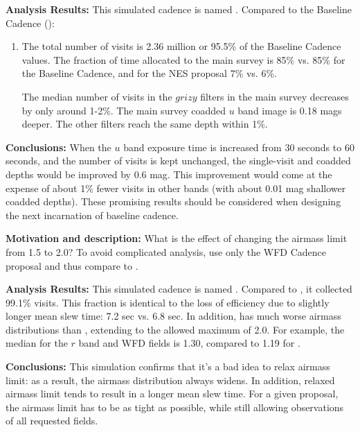 {\bf Analysis Results:}  This simulated cadence is named
.  Compared to the Baseline
Cadence ():
\begin{enumerate}
\item The total number of visits is 2.36 million or 95.5\% of the
Baseline Cadence values. The fraction of time allocated to the main
survey is 85\% vs. 85\% for the Baseline Cadence, and for the NES
proposal 7\% vs. 6\%.

The median number of visits in the $grizy$ filters in the main survey
decreases by only around 1-2\%.  The main survey coadded $u$ band image is 0.18
mags deeper. The other filters reach the same depth within 1\%.
\end{enumerate}


{\bf Conclusions:} When the $u$ band exposure time is increased from
30 seconds to 60 seconds, and the number of visits is kept unchanged,
the single-visit and coadded depths would be improved by 0.6 mag. This
improvement would come at the expense of about 1\% fewer visits in
other bands (with about 0.01 mag shallower coadded depths). These
promising results should be considered when designing the next
incarnation of baseline cadence.



{\bf Motivation and description:}  What is the effect of changing the
airmass limit from 1.5 to 2.0?  To avoid complicated analysis, use
only the WFD Cadence proposal and thus compare to
.


{\bf Analysis Results:}  This simulated cadence is named
.  Compared to
, it collected 99.1\% visits. This fraction is
identical to the loss of efficiency due to slightly longer mean slew
time: 7.2 sec vs. 6.8 sec. In addition,
 has much worse airmass
distributions than , extending to the allowed
maximum of 2.0. For example, the median for the $r$ band and WFD fields
is 1.30, compared to 1.19 for .

{\bf Conclusions:} This simulation confirms that it's a bad idea to
relax airmass limit: as a result, the airmass distribution always
widens. In addition, relaxed airmass limit tends to result in a longer
mean slew time.  For a given proposal, the airmass limit has to be as
tight as possible, while still allowing observations of all requested
fields.


